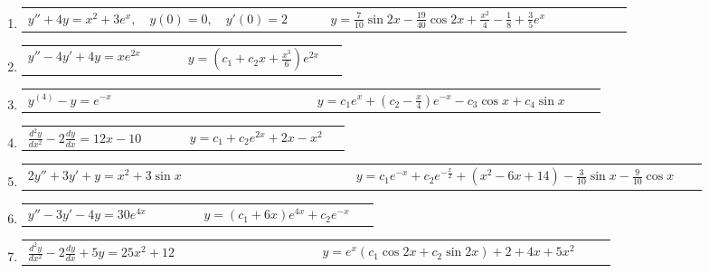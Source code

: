 \documentclass[a4paper,12pt]{article}
\begin{document}
\begin{enumerate}
    \item
    \begin{tabularx}{\linewidth}{L{0.45\linewidth} R{0.45\linewidth}}
    \( y'' + 4y = x^2 + 3e^x, \quad y(0) = 0, \quad y'(0) = 2 \) & \(\displaystyle y = \frac{7}{10} \sin 2x - \frac{19}{40} \cos 2x + \frac{x^2}{4} - \frac{1}{8} + \frac{3}{5} e^x \)
    \end{tabularx}
    
    \item
    \begin{tabularx}{\linewidth}{L{0.45\linewidth} R{0.45\linewidth}}
    \( y'' - 4 y' + 4 y = x e^{2x} \) & \(\displaystyle y = (c_1 + c_2 x + \frac{x^3}{6}) e^{2x} \)
    \end{tabularx}
    
    \item
    \begin{tabularx}{\linewidth}{L{0.45\linewidth} R{0.45\linewidth}}
    \( y^{(4)} - y = e^{-x} \) & \(\displaystyle y = c_1 e^x + \left(c_2 - \frac{x}{4}\right) e^{-x} - c_3 \cos x + c_4 \sin x \)
    \end{tabularx}
    
    \item
    \begin{tabularx}{\linewidth}{L{0.45\linewidth} R{0.45\linewidth}}
    \( \frac{d^2 y}{dx^2} - 2 \frac{dy}{dx} = 12 x - 10 \) & \(\displaystyle y = c_1 + c_2 e^{2x} + 2x - x^2 \)
    \end{tabularx}
    
    \item
    \begin{tabularx}{\linewidth}{L{0.45\linewidth} R{0.45\linewidth}}
    \( 2 y'' + 3 y' + y = x^2 + 3 \sin x \) & \(\displaystyle y = c_1 e^{-x} + c_2 e^{-\frac{x}{2}} + (x^2 - 6x + 14) - \frac{3}{10} \sin x - \frac{9}{10} \cos x \)
    \end{tabularx}
    
    \item
    \begin{tabularx}{\linewidth}{L{0.45\linewidth} R{0.45\linewidth}}
    \( y'' - 3 y' - 4 y = 30 e^{4x} \) & \(\displaystyle y = (c_1 + 6 x) e^{4x} + c_2 e^{-x} \)
    \end{tabularx}
    
    \item
    \begin{tabularx}{\linewidth}{L{0.45\linewidth} R{0.45\linewidth}}
    \( \frac{d^2 y}{dx^2} - 2 \frac{dy}{dx} + 5 y = 25 x^2 + 12 \) & \(\displaystyle y = e^x \left(c_1 \cos 2x + c_2 \sin 2x \right) + 2 + 4x + 5x^2 \)
    \end{tabularx}
    

\end{enumerate}
\end{document}
